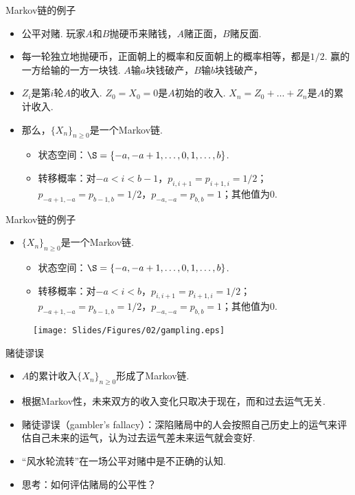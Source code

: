 \begin{frame}{Markov链的例子}
\begin{itemize}
    \item 公平对赌. 玩家$A$和$B$抛硬币来赌钱，$A$赌正面，$B$赌反面.
    \item 每一轮独立地抛硬币，正面朝上的概率和反面朝上的概率相等，都是$1/2$. 赢的一方给输的一方一块钱. $A$输$a$块钱破产，$B$输$b$块钱破产，
    \item $Z_i$是第$i$轮$A$的收入. $Z_0=X_0=0$是$A$初始的收入. $X_n=Z_0+\dots+Z_n$是$A$的累计收入.
    \item 那么，$\{X_n\}_{n\geq 0}$是一个Markov链.
    \begin{itemize}
        \item 状态空间：$\S=\{-a,-a+1,\dots,0,1,\dots,b\}$.
        \item 转移概率：对$-a<i<b-1$，$p_{i,i+1}=p_{i+1,i}=1/2$；$p_{-a+1,-a}=p_{b-1,b}=1/2$，$p_{-a,-a}=p_{b,b}=1$；其他值为$0$.
    \end{itemize}
\end{itemize}
\end{frame}

\begin{frame}{Markov链的例子}
\begin{itemize}
    \item  $\{X_n\}_{n\geq 0}$是一个Markov链.
    \begin{itemize}
        \item 状态空间：$\S=\{-a,-a+1,\dots,0,1,\dots,b\}$.
        \item 转移概率：对$-a<i<b$，$p_{i,i+1}=p_{i+1,i}=1/2$；$p_{-a+1,-a}=p_{b-1,b}=1/2$，$p_{-a,-a}=p_{b,b}=1$；其他值为$0$.
    \end{itemize}
\end{itemize}
\begin{figure}[ht]
    \centering
    \texttt{[image: Slides/Figures/02/gampling.eps]}
\end{figure}
\end{frame}

\begin{frame}{赌徒谬误}
\begin{itemize}
    \item $A$的累计收入$\{X_n\}_{n\geq 0}$形成了Markov链.
    \item 根据Markov性，未来双方的收入变化只取决于现在，而和过去运气无关.
    \item 赌徒谬误（gambler's fallacy）：深陷赌局中的人会按照自己历史上的运气来评估自己未来的运气，认为过去运气差未来运气就会变好.
    \item ``风水轮流转''在一场公平对赌中是不正确的认知.
    \item 思考：如何评估赌局的公平性？
\end{itemize}
\end{frame}

